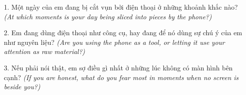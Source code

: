 \begin{tuhocnhanh}
1. Một ngày của em đang bị cắt vụn bởi điện thoại ở những khoảnh khắc nào? \textit{(At which moments is your day being sliced into pieces by the phone?)}

2. Em đang dùng điện thoại như công cụ, hay đang để nó dùng sự chú ý của em như nguyên liệu? \textit{(Are you using the phone as a tool, or letting it use your attention as raw material?)}

3. Nếu phải nói thật, em sợ điều gì nhất ở những lúc không có màn hình bên cạnh? \textit{(If you are honest, what do you fear most in moments when no screen is beside you?)}
\end{tuhocnhanh}

\ngancach